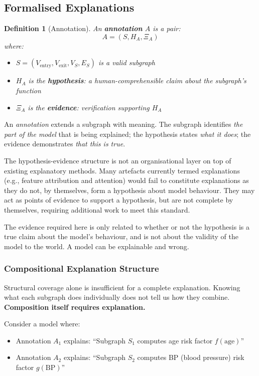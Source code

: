 \documentclass{article}
\newtheorem{definition}{Definition}
\begin{document}
\subsection{Formalised Explanations}

\begin{definition}[Annotation]
\label{def:annotation}
An \textbf{annotation} $A$ is a pair:
\[
A = (S, H_A, \Xi_A)
\]
where:
\begin{itemize}
    \item $S = (V_{\text{entry}}, V_{\text{exit}}, V_S, E_S)$ is a valid subgraph
    \item $H_A$ is the \textbf{hypothesis}: a human-comprehensible claim about the subgraph's function
    \item $\Xi_A$ is the \textbf{evidence}: verification supporting $H_A$
\end{itemize}
\end{definition}

An \emph{annotation} extends a subgraph with meaning. The subgraph identifies \emph{the part of the model} that is being explained; the hypothesis states \emph{what it does}; the evidence demonstrates \emph{that this is true}.


The hypothesis-evidence structure is not an organisational layer on top of existing explanatory methods. Many artefacts currently termed explanations (e.g., feature attribution and attention) would fail to constitute explanations as they do not, by themselves, form a hypothesis about model behaviour. They may act as points of evidence to support a hypothesis, but are not complete by themselves, requiring additional work to meet this standard.

The evidence required here is only related to whether or not the hypothesis is a true claim about the model's behaviour, and is not about the validity of the model to the world. A model can be  explainable and wrong.

\subsubsection{Compositional Explanation Structure}

Structural coverage alone is insufficient for a complete explanation. Knowing what each subgraph does individually does not tell us how they combine. \textbf{Composition itself requires explanation.}


Consider a model where:
\begin{itemize}
    \item Annotation $A_1$ explains: ``Subgraph $S_1$ computes age risk factor $f(\text{age})$''
    \item Annotation $A_2$ explains: ``Subgraph $S_2$ computes BP (blood pressure) risk factor $g(\text{BP})$''
\end{itemize}
\end{document}
